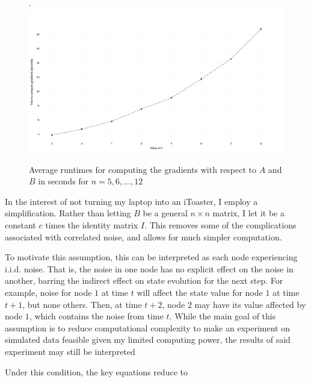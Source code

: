 \documentclass[12pt]{article}
\theoremstyle{definition}
\begin{document}
\begin{figure}[hbt!]
    \vspace{0.1in}
    \par
    \begin{center}
    \caption{Average runtimes for computing the gradients with respect to $A$ and $B$ in seconds for $n = 5, 6, \ldots, 12$}.
    \label{fig:runtime}
    \includegraphics[scale=0.11]{Figures/runtime.png}
    \end{center}
    \par
    \vspace{-0.25in}
    \medskip
\end{figure}

In the interest of not turning my laptop into an iToaster, I employ a simplification. Rather than letting $B$ be a general $n \times n$ matrix, I let it be a constant $c$ times the identity matrix $I$. This removes some of the complications associated with correlated noise, and allows for much simpler computation. 

To motivate this assumption, this can be interpreted as each node experiencing i.i.d. noise. That is, the noise in one node has no explicit effect on the noise in another, barring the indirect effect on state evolution for the next step. For example, noise for node $1$ at time $t$ will affect the state value for node $1$ at time $t + 1$, but none others. Then, at time $t + 2$, node $2$ may have its value affected by node $1$, which contains the noise from time $t$. While the main goal of this assumption is to reduce computational complexity to make an experiment on simulated data feasible given my limited computing power, the results of said experiment may still be interpreted 

Under this condition, the key equations reduce to
\end{document}
